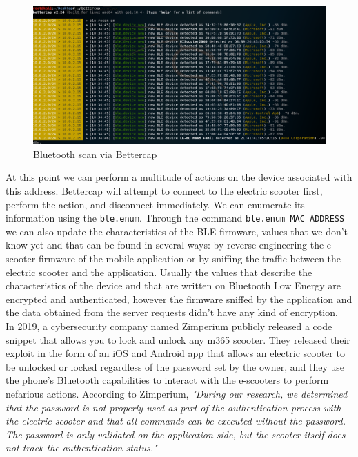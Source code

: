 \documentclass[binding=0.6cm,LaM,noexaminfo]{sapthesis}
\begin{document}
\begin{figure}[!htp]
    \centering
    \includegraphics[width = .9\textwidth]{images/p22_7.png}
    \caption{Bluetooth scan via Bettercap}
    \label{fig:bettercpa_scan}
\end{figure}


\noindent At this point we can perform a multitude of actions on the device associated with this address. Bettercap will attempt to connect to the electric scooter first, perform the action, and disconnect immediately. We can enumerate its information using the \lstinline[basicstyle=\ttfamily, language=bash]|ble.enum|. Through the command \lstinline[basicstyle=\ttfamily, language=bash]|ble.enum MAC ADDRESS| we can also update the characteristics of the BLE firmware, values that we don't know yet and that can be found in several ways: by reverse engineering the e-scooter firmware of the mobile application or by sniffing the traffic between the electric scooter and the application. Usually the values that describe the characteristics of the device and that are written on Bluetooth Low Energy are encrypted and authenticated, however the firmware sniffed by the application and the data obtained from the server requests didn't have any kind of encryption.\\

\noindent In 2019, a cybersecurity company named Zimperium publicly released a code snippet that allows you to lock and unlock any m365 scooter. They released their exploit in the form of an iOS and Android app that allows an electric scooter to be unlocked or locked regardless of the password set by the owner, and they use the phone's Bluetooth capabilities to interact with the e-scooters to perform nefarious actions. According to Zimperium, \textit{"During our research, we determined that the password is not properly used as part of the authentication process with the electric scooter and that all commands can be executed without the password. The password is only validated on the application side, but the scooter itself does not track the authentication status."}\\
\end{document}
